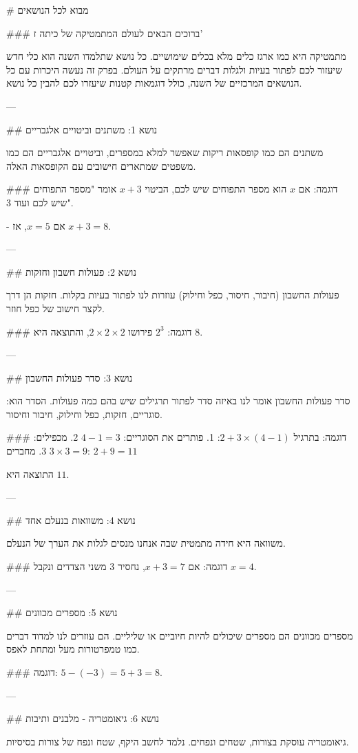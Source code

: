 # מבוא לכל הנושאים

### ברוכים הבאים לעולם המתמטיקה של כיתה ז'

מתמטיקה היא כמו ארגז כלים מלא בכלים שימושיים. כל נושא שתלמדו השנה הוא כלי חדש שיעזור לכם לפתור בעיות ולגלות דברים מרתקים על העולם. בפרק זה נעשה היכרות עם כל הנושאים המרכזיים של השנה, כולל דוגמאות קטנות שיעזרו לכם להבין כל נושא.

---

## נושא 1: משתנים וביטויים אלגבריים

משתנים הם כמו קופסאות ריקות שאפשר למלא במספרים, וביטויים אלגבריים הם כמו משפטים שמתארים חישובים עם הקופסאות האלה.

### דוגמה:
אם $x$ הוא מספר התפוחים שיש לכם, הביטוי $x + 3$ אומר "מספר התפוחים שיש לכם ועוד 3".

- אם $x = 5$, אז $x + 3 = 8$.

---

## נושא 2: פעולות חשבון וחזקות

פעולות החשבון (חיבור, חיסור, כפל וחילוק) עוזרות לנו לפתור בעיות בקלות. חזקות הן דרך לקצר חישוב של כפל חוזר.

### דוגמה:
$2^3$ פירושו $2 \times 2 \times 2$, והתוצאה היא $8$.

---

## נושא 3: סדר פעולות החשבון

סדר פעולות החשבון אומר לנו באיזה סדר לפתור תרגילים שיש בהם כמה פעולות. הסדר הוא: סוגריים, חזקות, כפל וחילוק, חיבור וחיסור.

### דוגמה:
בתרגיל $2 + 3 \times (4 - 1)$:
1. פותרים את הסוגריים: $4 - 1 = 3$
2. מכפילים: $3 \times 3 = 9$
3. מחברים: $2 + 9 = 11$

התוצאה היא $11$.

---

## נושא 4: משוואות בנעלם אחד

משוואה היא חידה מתמטית שבה אנחנו מנסים לגלות את הערך של הנעלם.

### דוגמה:
אם $x + 3 = 7$, נחסיר 3 משני הצדדים ונקבל $x = 4$.

---

## נושא 5: מספרים מכוונים

מספרים מכוונים הם מספרים שיכולים להיות חיוביים או שליליים. הם עוזרים לנו למדוד דברים כמו טמפרטורות מעל ומתחת לאפס.

### דוגמה:
$5 - (-3)$ = $5 + 3 = 8$.

---

## נושא 6: גיאומטריה - מלבנים ותיבות

גיאומטריה עוסקת בצורות, שטחים ונפחים. נלמד לחשב היקף, שטח ונפח של צורות בסיסיות.


